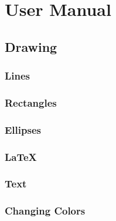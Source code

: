 \chapter{User Manual}
\section{Drawing}
\subsection{Lines}
\subsection{Rectangles}
\subsection{Ellipses}
\subsection{LaTeX}
\subsection{Text}
\subsection{Changing Colors}
